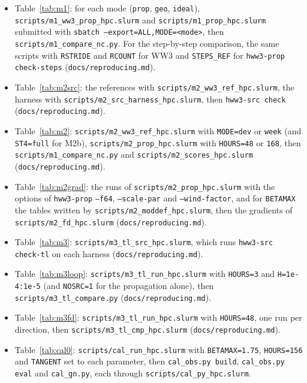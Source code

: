 \documentclass[11pt,a4paper]{article}
\begin{document}
\begin{itemize}
  (\texttt{docs/reproducing.md}).
\item Table~\ref{tab:m1}: for each mode (\texttt{prop}, \texttt{geo},
  \texttt{ideal}), \texttt{scripts/m1\_ww3\_prop\_hpc.slurm} and
  \texttt{scripts/m1\_prop\_hpc.slurm} submitted with
  \texttt{sbatch --export=ALL,MODE=<mode>}, then
  \texttt{scripts/m1\_compare\_nc.py}. For the step-by-step comparison,
  the same scripts with \texttt{RSTRIDE} and \texttt{RCOUNT} for WW3 and
  \texttt{STEPS\_REF} for \texttt{hww3-prop check-steps}
  (\texttt{docs/reproducing.md}).
\item Table~\ref{tab:m2src}: the references with
  \texttt{scripts/m2\_ww3\_ref\_hpc.slurm}, the harness with
  \texttt{scripts/m2\_src\_harness\_hpc.slurm}, then
  \texttt{hww3-src check} (\texttt{docs/reproducing.md}).
\item Table~\ref{tab:m2}: \texttt{scripts/m2\_ww3\_ref\_hpc.slurm} with
  \texttt{MODE=dev} or \texttt{week} (and \texttt{ST4=full} for M2b),
  \texttt{scripts/m2\_prop\_hpc.slurm} with \texttt{HOURS=48} or
  \texttt{168}, then \texttt{scripts/m1\_compare\_nc.py} and
  \texttt{scripts/m2\_scores\_hpc.slurm} (\texttt{docs/reproducing.md}).
\item \begin{sloppypar}Table~\ref{tab:m2grad}: the runs of
  \texttt{scripts/m2\_prop\_hpc.slurm} with the options of
  \texttt{hww3-prop} \texttt{--f64}, \texttt{--scale-par} and
  \texttt{--wind-factor}, and for \texttt{BETAMAX} the tables written by
  \texttt{scripts/m2\_moddef\_hpc.slurm}, then the gradients of
  \texttt{scripts/m2\_fd\_hpc.slurm}
  (\texttt{docs/reproducing.md}).\end{sloppypar}
\item Table~\ref{tab:m3}: \texttt{scripts/m3\_tl\_src\_hpc.slurm}, which
  runs \texttt{hww3-src check-tl} on each harness
  (\texttt{docs/reproducing.md}).
\item Table~\ref{tab:m3loop}: \texttt{scripts/m3\_tl\_run\_hpc.slurm}
  with \texttt{HOURS=3} and \texttt{H=1e-4:1e-5} (and \texttt{NOSRC=1}
  for the propagation alone), then \texttt{scripts/m3\_tl\_compare.py}
  (\texttt{docs/reproducing.md}).
\item Table~\ref{tab:m3fd}: \texttt{scripts/m3\_tl\_run\_hpc.slurm} with
  \texttt{HOURS=48}, one run per direction, then
  \texttt{scripts/m3\_tl\_cmp\_hpc.slurm} (\texttt{docs/reproducing.md}).
\item \begin{sloppypar}Table~\ref{tab:cal0}:
  \texttt{scripts/cal\_run\_hpc.slurm} with \texttt{BETAMAX=1.75},
  \texttt{HOURS=156} and \texttt{TANGENT} set to each parameter, then
  \texttt{cal\_obs.py build}, \texttt{cal\_obs.py eval} and
  \texttt{cal\_gn.py}, each through
  \texttt{scripts/cal\_py\_hpc.slurm}.\end{sloppypar}
\end{itemize}
\end{document}
